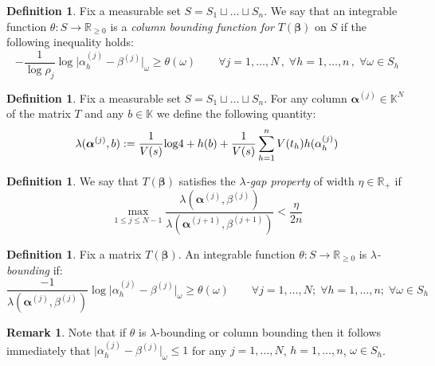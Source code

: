 \documentclass[10 pt,a4paper]{article}
\theoremstyle{plain}
\theoremstyle{definition}
\newtheorem{defn}[thm]{Definition}
\newtheorem{rem}[thm]{Remark}
\theoremstyle{named}
\begin{document}
\begin{defn}\label{bounding} Fix a measurable set $S=S_1\sqcup\ldots\sqcup S_n$. We say that an integrable function $\theta\colon S\to\mathbb R_{\ge 0}$ is a \emph{column bounding function for} $T(\bm{\beta})$ on $S$ if 
the following inequality holds:
\begin{equation}\label{boundingbis}
-\frac{1}{\log \rho_{j}}{\log}\vert \alpha^{(j)}_h-\beta^{(j)}\vert_\omega\ge\theta (\omega)\qquad \forall j=1,\ldots,N\,,\; \forall h=1,\ldots,n\,,\; \forall\omega\in S_h 
\end{equation}
\end{defn}

\begin{defn}
Fix a measurable set $S=S_1\sqcup\ldots\sqcup S_n$. For any column $\bm{\alpha}^{(j)}\in\mathbb K^N$  of the matrix $T$ and any $b\in\mathbb K$ we define the following quantity:
$$
\lambda(\bm{\alpha}^{(j)},b):=\frac{1}{V(s)}{\rm{log}}4+h(b)+\frac{1}{V(s)}\sum_{h=1}^{n}V(t_h)h(\alpha_{h}^{(j)})
$$
\end{defn}

\begin{defn}\label{lambda_gap} We say that  $T(\bm{\beta})$ satisfies the \emph{$\lambda$-gap property} of width $\eta\in\mathbb R_+$ if
$$
\max_{1\leq j\leq N-1}\frac{\lambda(\bm{\alpha}^{(j)},\beta^{(j)})}{\lambda(\bm{\alpha}^{(j+1)},\beta^{(j+1)})}<\frac{\eta}{2n}
$$
\end{defn}


\begin{defn}\label{lambda_bou} Fix a matrix $T(\bm{\beta})$. An integrable function $\theta\colon S\to \mathbb R_{\ge 0}$ is \emph{$\lambda$-bounding} if:
\begin{equation}\label{pequality}
\frac{-1}{\lambda(\bm{\alpha}^{(j)},\beta^{(j)})}
{\log}\vert \alpha^{(j)}_h-\beta^{(j)}|_{\omega} \ge\theta(\omega)\qquad \forall j=1,\dots ,N;\;\forall h=1,\dots,n;\;\forall \omega\in S_h
\end{equation}
\end{defn}

\begin{rem}\label{rem_forthelemma}
Note that if $\theta$ is $\lambda$-bounding or column bounding then it follows immediately that $\vert \alpha^{(j)}_h-\beta^{(j)}|_{\omega}\le 1$ for any  $j=1,\dots ,N$, $h=1,\dots,n$, $\omega\in S_h$.
\end{rem}
\end{document}
